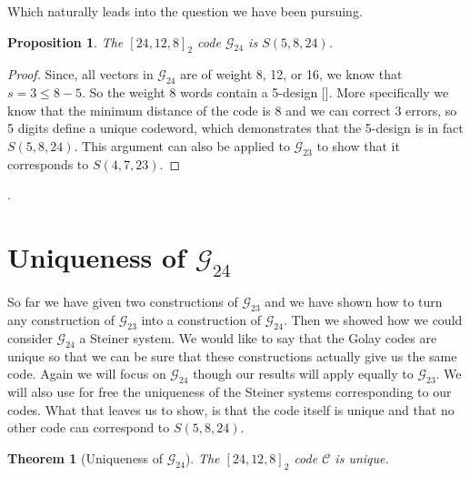 \documentclass[paper=a4, fontsize=11pt]{scrartcl} %
\numberwithin{equation}{section} %
\numberwithin{figure}{section} %
\numberwithin{table}{section} %
\theoremstyle{break}
\newtheorem{thm}{Theorem}
\newtheorem{prop}{Proposition}
\begin{document}
Which naturally leads into the question we have been pursuing.
\begin{prop}
The $[24,12,8]_2$ code $\mathcal{G}_{24}$ is $S(5,8,24)$.
\end{prop}
\begin{proof} 
Since, all vectors in $\mathcal{G}_{24}$ are of weight 8, 12, or 16, we know that $s=3 \leq 8-5$. So the weight 8 words contain a 5-design [\cite{pless}]. More specifically we know that the minimum distance of the code is 8 and we can correct 3 errors, so 5 digits define a unique codeword, which demonstrates that the 5-design is in fact $S(5,8,24)$. This argument can also be applied to $\mathcal{G}_{23}$ to show that it corresponds to $S(4,7,23)$.
\end{proof}.

\section{Uniqueness of $\mathcal{G}_{24}$}
So far we have given two constructions of $\mathcal{G}_{23}$ and we have shown how to turn any construction of $\mathcal{G}_{23}$ into a construction of $\mathcal{G}_{24}$. Then we showed how we could consider $\mathcal{G}_{24}$ a Steiner system. We would like to say that the Golay codes are unique so that we can be sure that these constructions actually give us the same code. Again we will focus on $\mathcal{G}_{24}$ though our results will apply equally to $\mathcal{G}_{23}$. We will also use for free the uniqueness of the Steiner systems corresponding to our codes. What that leaves us to show, is that the code itself is unique and that no other code can correspond to $S(5,8,24)$.

\begin{thm}[Uniqueness of $\mathcal{G}_{24}$]
 The $[24,12,8]_2$ code $\mathcal{C}$ is unique.
\end{thm}
\end{document}
